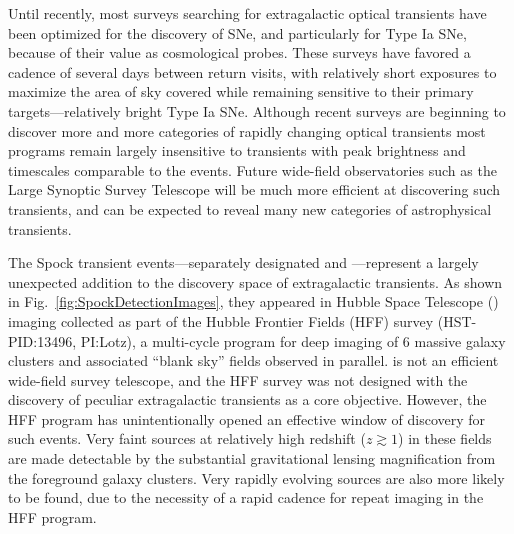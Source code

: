 Until recently, most surveys searching for extragalactic optical
transients have been optimized for the discovery of SNe, and
particularly for Type Ia SNe, because of their value as cosmological
probes\cite{Weinberg:2013}.  These surveys have favored a cadence of
several days between return visits, with relatively short exposures to
maximize the area of sky covered while remaining sensitive to their
primary targets---relatively bright Type Ia SNe.  Although recent
surveys are beginning to discover more and more categories of rapidly
changing optical transients\cite{Kasliwal:2011a,Drout:2014} most
programs remain largely insensitive to transients with peak brightness
and timescales comparable to the \spock events\cite{Berger:2013b}.
Future wide-field observatories such as the Large Synoptic Survey
Telescope\cite{Tyson:2002} will be much more efficient at discovering
such transients, and can be expected to reveal many new categories of
astrophysical transients.

The Spock transient events---separately designated \spockone and
\spocktwo---represent a largely unexpected addition to the discovery
space of extragalactic transients.  As shown in
Fig.~\ref{fig:SpockDetectionImages}, they appeared in Hubble Space
Telescope (\HST) imaging collected as part of the Hubble Frontier
Fields (HFF) survey (HST-PID:13496, PI:Lotz), a multi-cycle program
for deep imaging of 6 massive galaxy clusters and associated ``blank
sky'' fields observed in parallel.  \HST is not an efficient
wide-field survey telescope, and the HFF survey was not designed with
the discovery of peculiar extragalactic transients as a core
objective.  However, the HFF program has unintentionally opened an
effective window of discovery for such events.  Very faint sources at
relatively high redshift ($z\gtrsim1$) in these fields are made
detectable by the substantial gravitational lensing magnification from
the foreground galaxy clusters.  Very rapidly evolving sources are
also more likely to be found, due to the necessity of a rapid cadence
for repeat imaging in the HFF program.


